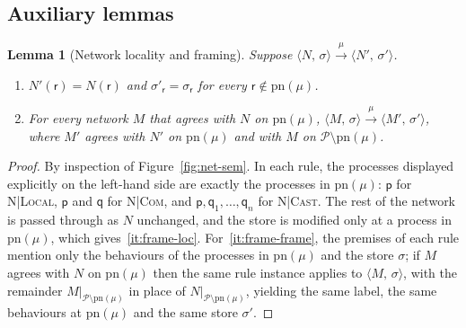 \documentclass[11pt]{article}
\theoremstyle{plain}
\newtheorem{lemma}[theorem]{Lemma}
\theoremstyle{definition}
\theoremstyle{remark}
\newcommand{\pp}{\mathsf{p}}
\newcommand{\qq}{\mathsf{q}}
\newcommand{\rr}{\mathsf{r}}
\newcommand{\Procs}{\mathcal{P}}
\newcommand{\pn}{\mathrm{pn}}
\newcommand{\conf}[2]{\langle #1,\, #2\rangle}
\newcommand{\lto}[1]{\xrightarrow{\;#1\;}}
\newcommand{\rn}[1]{{\normalfont\scshape #1}}
\newcommand{\restr}[2]{#1|_{#2}}
\begin{document}
\subsection{Auxiliary lemmas}

\begin{lemma}[Network locality and framing]\label{lem:frame}
  Suppose $\conf{N}{\sigma}\lto{\mu}\conf{N'}{\sigma'}$.
  \begin{enumerate}[label=(\roman*),nosep]
  \item\label{it:frame-loc} $N'(\rr) = N(\rr)$ and $\sigma'_\rr = \sigma_\rr$ for every $\rr\notin\pn(\mu)$.
  \item\label{it:frame-frame} For every network $M$ that agrees with $N$ on
    $\pn(\mu)$, $\conf{M}{\sigma}\lto{\mu}\conf{M'}{\sigma'}$, where $M'$
    agrees with $N'$ on $\pn(\mu)$ and with $M$ on $\Procs\setminus\pn(\mu)$.
  \end{enumerate}
\end{lemma}
\begin{proof}
  By inspection of Figure~\ref{fig:net-sem}.  In each rule, the processes
  displayed explicitly on the left-hand side are exactly the processes in
  $\pn(\mu)$: $\pp$ for \rn{N|Local}, $\pp$ and $\qq$ for \rn{N|Com}, and
  $\pp,\qq_1,\ldots,\qq_n$ for \rn{N|Cast}.  The rest of the network is passed
  through as $N$ unchanged, and the store is modified only at a process in
  $\pn(\mu)$, which gives~\ref{it:frame-loc}.  For~\ref{it:frame-frame}, the
  premises of each rule mention only the behaviours of the processes in
  $\pn(\mu)$ and the store $\sigma$; if $M$ agrees with $N$ on $\pn(\mu)$ then
  the same rule instance applies to $\conf{M}{\sigma}$, with the remainder
  $\restr{M}{\Procs\setminus\pn(\mu)}$ in place of
  $\restr{N}{\Procs\setminus\pn(\mu)}$, yielding the same label, the same
  behaviours at $\pn(\mu)$ and the same store $\sigma'$.
\end{proof}
\end{document}
